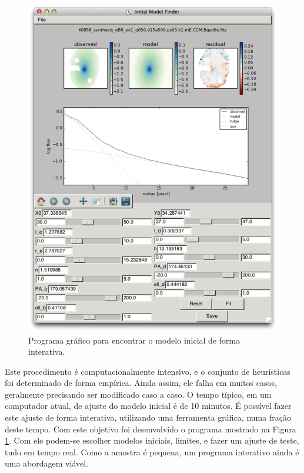 \begin{figure}
	\includegraphics[width=1.0\columnwidth]{figuras/model_finder}
	\caption[Programa gráfico para encontrar o modelo inicial]
	{Programa gráfico para encontrar o modelo inicial de forma interativa.}
	\label{fig:modelFinder}
\end{figure}

Este procedimento é computacionalmente intensivo, e o conjunto de heurísticas
foi determinado de forma empírica. Ainda assim, ele falha em muitos casos,
geralmente precisando ser modificado caso a caso. O tempo típico, em um
computador atual, de ajuste do modelo inicial é de 10 minutos. É possível fazer
este ajuste de forma interativa, utilizando uma ferramenta gráfica, numa fração
deste tempo. Com este objetivo foi desenvolvido o programa mostrado na Figura
\ref{fig:modelFinder}. Com ele podem-se escolher modelos iniciais, limites, e
fazer um ajuste de teste, tudo em tempo real. Como a amostra é pequena, um
programa interativo ainda é uma abordagem viável.

